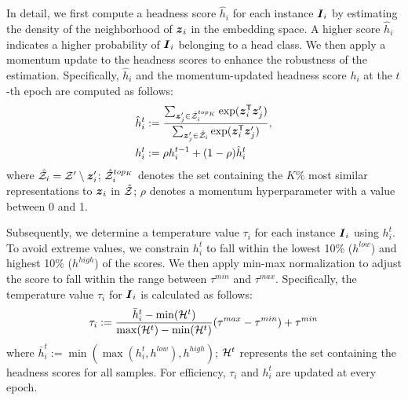 


% 



In detail, we first compute a headness score $\hat{h}_i$ for each instance $\boldsymbol{I}_i$ by estimating the density of the neighborhood of $\boldsymbol{z}_i$ in the embedding space. A higher score $\hat{h}_i$ indicates a higher probability of $\boldsymbol{I}_i$ belonging to a head class. We then apply a momentum update to the headness scores to enhance the robustness of the estimation. Specifically, $\hat{h}_i$ and the momentum-updated headness score $h_i$ at the $t$-th epoch are computed as follows:
\begin{equation}
\begin{split}
& \hat{h}_i^t := \frac{\sum_{\boldsymbol{z}'_j \in \hat{\mathcal{Z}}^{top_K}_i }\exp(\boldsymbol{z}_i^\mathsf{T} \boldsymbol{z}'_j)}{\sum_{\boldsymbol{z}'_j \in \hat{\mathcal{Z}}_i} \exp(\boldsymbol{z}_i^\mathsf{T} \boldsymbol{z}'_j)}, \\
& h_i^t := \rho h_i^{t-1}+(1-\rho) \hat{h}_i^t 
\label{eqn:headness}
\end{split}
\end{equation}
where $\hat{\mathcal{Z}}_i = \mathcal{Z}' \setminus \boldsymbol{z}'_i$; $\hat{\mathcal{Z}}^{top_K}_i$ denotes the set containing the $K\%$ most similar representations to $\boldsymbol{z}_i$ in $\hat{\mathcal{Z}}$; $\rho$ denotes a momentum hyperparameter with a value between 0 and 1.


Subsequently, we determine a temperature value $\tau_i$ for each instance $\boldsymbol{I}_i$ using $h_i^t$. To avoid extreme values, we constrain $h_i^t$ to fall within the lowest 10\% ($h^{low}$) and highest 10\% ($h^{high}$) of the scores. We then apply min-max normalization to adjust the score to fall within the range between $\tau^{min}$ and $\tau^{max}$. Specifically, the temperature value $\tau_i$ for $\boldsymbol{I}_i$ is calculated as follows:
\begin{equation}
\begin{split}
\tau_i := \frac{\bar{h}_i^t - \min(\mathcal{H}^t)}{\max(\mathcal{H}^t)-\min(\mathcal{H}^t)}(\tau^{max} - \tau^{min})+\tau^{min} 
\label{eqn:temperature}
\end{split}
\end{equation}
where $\bar{h}_i^t := \min ( \max (h_i^t, h^{low}), h^{high} )$; $\mathcal{H}^t$ represents the set containing the headness scores for all samples. For efficiency, $\tau_i$ and $h_i^t$ are updated at every epoch.


